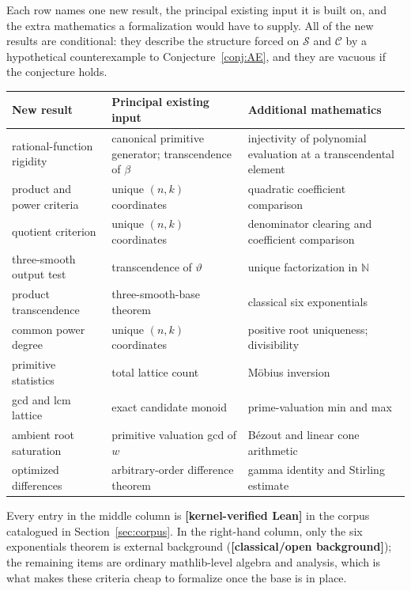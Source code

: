 \documentclass[11pt,oneside]{article}
\theoremstyle{definition}
\theoremstyle{remark}
\newcommand{\N}{\mathbb N}
\newcommand{\thetaq}{\vartheta}
\newcommand{\Sol}{\mathcal S}
\newcommand{\Cand}{\mathcal C}
\newcommand{\statuslean}{\textcolor{leanblue}{\textbf{[kernel-verified Lean]}}}
\newcommand{\statusknown}{\textcolor{classicalgray}{\textbf{[classical/open background]}}}
\begin{document}
Each row names one new result, the principal existing input it is built on, and the extra
mathematics a formalization would have to supply.  All of the new results are conditional:
they describe the structure forced on $\Sol$ and $\Cand$ by a hypothetical counterexample to
Conjecture~\ref{conj:AE}, and they are vacuous if the conjecture holds.

\begin{center}
\small
\begin{tabular}{@{}p{}p{}p{}@{}}
\toprule
New result & Principal existing input & Additional mathematics \\
\midrule
rational-function rigidity &
canonical primitive generator; transcendence of $\beta$ &
injectivity of polynomial evaluation at a transcendental element \\
\addlinespace
product and power criteria &
unique $(n,k)$ coordinates &
quadratic coefficient comparison \\
\addlinespace
quotient criterion &
unique $(n,k)$ coordinates &
denominator clearing and coefficient comparison \\
\addlinespace
three-smooth output test &
transcendence of $\thetaq$ &
unique factorization in $\N$ \\
\addlinespace
product transcendence &
three-smooth-base theorem &
classical six exponentials \\
\addlinespace
common power degree &
unique $(n,k)$ coordinates &
positive root uniqueness; divisibility \\
\addlinespace
primitive statistics &
total lattice count &
M\"obius inversion \\
\addlinespace
gcd and lcm lattice &
exact candidate monoid &
prime-valuation min and max \\
\addlinespace
ambient root saturation &
primitive valuation gcd of $w$ &
B\'ezout and linear cone arithmetic \\
\addlinespace
optimized differences &
arbitrary-order difference theorem &
gamma identity and Stirling estimate \\
\bottomrule
\end{tabular}
\end{center}

Every entry in the middle column is \statuslean{} in the corpus catalogued in
Section~\ref{sec:corpus}.  In the right-hand column, only the six exponentials theorem is
external background (\statusknown); the remaining items are ordinary mathlib-level algebra
and analysis, which is what makes these criteria cheap to formalize once the base is in
place.
\end{document}
